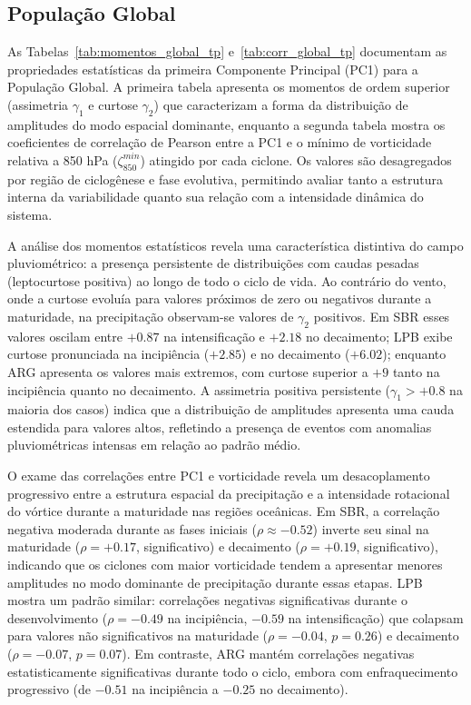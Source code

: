 \subsection{População Global}\label{subsubsec:pc1_global_tp}





As Tabelas~\ref{tab:momentos_global_tp} e~\ref{tab:corr_global_tp} documentam as propriedades estatísticas da primeira Componente Principal (PC1) para a População Global.
A primeira tabela apresenta os momentos de ordem superior (assimetria $\gamma_1$ e curtose $\gamma_2$) que caracterizam a forma da distribuição de amplitudes do modo espacial dominante, enquanto a segunda tabela mostra os coeficientes de correlação de Pearson entre a PC1 e o mínimo de vorticidade relativa a 850 hPa ($\zeta_{850}^{min}$) atingido por cada ciclone.
Os valores são desagregados por região de ciclogênese e fase evolutiva, permitindo avaliar tanto a estrutura interna da variabilidade quanto sua relação com a intensidade dinâmica do sistema.

A análise dos momentos estatísticos revela uma característica distintiva do campo pluviométrico: a presença persistente de distribuições com caudas pesadas (leptocurtose positiva) ao longo de todo o ciclo de vida.
Ao contrário do vento, onde a curtose evoluía para valores próximos de zero ou negativos durante a maturidade, na precipitação observam-se valores de $\gamma_2$ positivos.
Em SBR esses valores oscilam entre $+0.87$ na intensificação e $+2.18$ no decaimento; LPB exibe curtose pronunciada na incipiência ($+2.85$) e no decaimento ($+6.02$); enquanto ARG apresenta os valores mais extremos, com curtose superior a $+9$ tanto na incipiência quanto no decaimento.
A assimetria positiva persistente ($\gamma_1 > +0.8$ na maioria dos casos) indica que a distribuição de amplitudes apresenta uma cauda estendida para valores altos, refletindo a presença de eventos com anomalias pluviométricas intensas em relação ao padrão médio.

O exame das correlações entre PC1 e vorticidade revela um desacoplamento progressivo entre a estrutura espacial da precipitação e a intensidade rotacional do vórtice durante a maturidade nas regiões oceânicas.
Em SBR, a correlação negativa moderada durante as fases iniciais ($\rho \approx -0.52$) inverte seu sinal na maturidade ($\rho = +0.17$, significativo) e decaimento ($\rho = +0.19$, significativo), indicando que os ciclones com maior vorticidade tendem a apresentar menores amplitudes no modo dominante de precipitação durante essas etapas.
LPB mostra um padrão similar: correlações negativas significativas durante o desenvolvimento ($\rho = -0.49$ na incipiência, $-0.59$ na intensificação) que colapsam para valores não significativos na maturidade ($\rho = -0.04$, $p = 0.26$) e decaimento ($\rho = -0.07$, $p = 0.07$).
Em contraste, ARG mantém correlações negativas estatisticamente significativas durante todo o ciclo, embora com enfraquecimento progressivo (de $-0.51$ na incipiência a $-0.25$ no decaimento).

